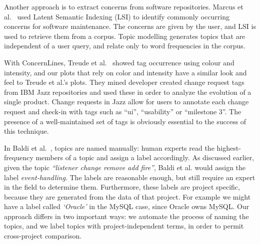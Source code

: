 \documentclass[smallextended]{svjour3}       %
\begin{document}
Another approach is to extract concerns from software repositories.
Marcus et al.~\cite{marcus04wcre} used Latent Semantic Indexing (LSI)
to identify commonly occurring concerns for software maintenance. 
The
concerns are given by the user, and LSI is used to retrieve them from
a corpus. 
Topic modelling generates topics that are independent of a user query, and relate only to word frequencies in the corpus.

With ConcernLines, Treude et al.~\cite{treude09cl} showed tag occurrence
using colour and intensity, and our plots that rely on color and intensity
have a similar look and feel to Treude et al.'s plots.
They mined
developer created 
change request tags from IBM Jazz
repositories and used these 
in order to analyze the evolution of a single product.
Change requests in Jazz allow for users to annotate each change
request and check-in with tags such as ``ui'', ``usability'' or
``milestone 3''. 
The presence of a well-maintained set of tags is obviously essential to the success of this technique.


In Baldi et al.~\cite{Baldi2008}, topics are named manually: human
experts read the highest-frequency members of a topic and assign a
label accordingly. 
As discussed earlier, given the topic \emph{``listener change remove add fire''}, Baldi et al. would assign the label \emph{event-handling}. 
The labels are reasonable enough, but still require an expert in the field to determine them. 
Furthermore, these labels are project specific, because they are
generated from the data of that project. For example we might have a label called \emph{`Oracle'}
in the MySQL case, since Oracle owns MySQL. 
Our approach differs in two important ways: we automate the process of naming the topics, and we label topics with project-independent terms, in order
to permit cross-project comparison.
\end{document}
